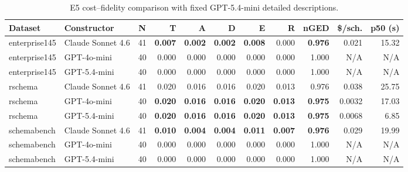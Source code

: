 \begin{table}[t]
\centering
\scriptsize
\caption{E5 cost--fidelity comparison with fixed GPT-5.4-mini detailed descriptions.}
\label{tab:e5_cost_fidelity}
\begin{tabular}{llcrrrrrrrr}
\toprule
Dataset & Constructor & N & T & A & D & E & R & nGED & \$/sch. & p50 (s) \\
\midrule
enterprise145 & Claude Sonnet 4.6 & 41 & \textbf{0.007} & \textbf{0.002} & \textbf{0.002} & \textbf{0.008} & 0.000 & \textbf{0.976} & 0.021 & 15.32 \\
enterprise145 & GPT-4o-mini & 40 & 0.000 & 0.000 & 0.000 & 0.000 & 0.000 & 1.000 & N/A & N/A \\
enterprise145 & GPT-5.4-mini & 40 & 0.000 & 0.000 & 0.000 & 0.000 & 0.000 & 1.000 & N/A & N/A \\
\midrule
rschema & Claude Sonnet 4.6 & 41 & 0.020 & 0.016 & 0.016 & 0.020 & 0.013 & 0.976 & 0.038 & 25.75 \\
rschema & GPT-4o-mini & 40 & \textbf{0.020} & \textbf{0.016} & \textbf{0.016} & \textbf{0.020} & \textbf{0.013} & \textbf{0.975} & 0.0032 & 17.03 \\
rschema & GPT-5.4-mini & 40 & \textbf{0.020} & \textbf{0.016} & \textbf{0.016} & \textbf{0.020} & \textbf{0.013} & \textbf{0.975} & 0.0068 & 6.85 \\
\midrule
schemabench & Claude Sonnet 4.6 & 41 & \textbf{0.010} & \textbf{0.004} & \textbf{0.004} & \textbf{0.011} & \textbf{0.007} & \textbf{0.976} & 0.029 & 19.99 \\
schemabench & GPT-4o-mini & 40 & 0.000 & 0.000 & 0.000 & 0.000 & 0.000 & 1.000 & N/A & N/A \\
schemabench & GPT-5.4-mini & 40 & 0.000 & 0.000 & 0.000 & 0.000 & 0.000 & 1.000 & N/A & N/A \\
\bottomrule
\end{tabular}
\end{table}
